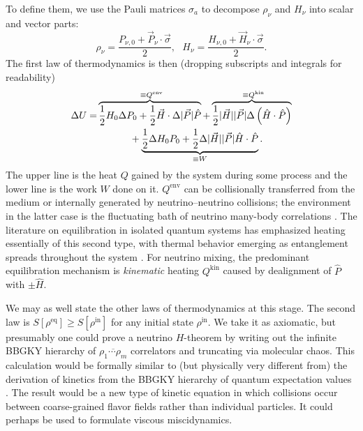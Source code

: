 \documentclass[aps,prd,twocolumn,groupedaddress,preprintnumbers]{revtex4-2}
\begin{document}
To define them, we use the Pauli matrices $\sigma_a$ to decompose $\rho_\nu$ and $H_\nu$ into scalar and vector parts:
\begin{equation}
\rho_\nu = \frac{P_{\nu,0} + \vec{P}_\nu \cdot \vec{\sigma}}{2}, ~~~ H_\nu = \frac{H_{\nu,0} + \vec{H}_\nu \cdot \vec{\sigma}}{2}.
\end{equation}
The first law of thermodynamics is then (dropping subscripts and integrals for readability)
\begin{align}
\Delta U = &\overbrace{\frac{1}{2} H_0 \Delta P_0 + \frac{1}{2} \vec{H} \cdot \Delta| \vec{P}| \hat{P}}^{~ \equiv Q^\textrm{env}} + \overbrace{\frac{1}{2} | \vec{H} | | \vec{P} | \Delta \left( \hat{H} \cdot \hat{P} \right)}^{~ \equiv Q^\textrm{kin}} \notag \\
&~~~~~~~~~~ +\underbrace{\frac{1}{2} \Delta H_0 P_0 + \frac{1}{2} \Delta | \vec{H} | | \vec{P} | \hat{H} \cdot \hat{P}}_{\equiv  W}. \label{eq:firstlaw}
\end{align}
The upper line is the heat $Q$ gained by the system during some process and the lower line is the work $W$ done on it. $Q^\textrm{env}$ can be collisionally transferred from the medium or internally generated by neutrino--neutrino collisions; the environment in the latter case is the fluctuating bath of neutrino many-body correlations \cite{johns2023b, kost2024once}. The literature on equilibration in isolated quantum systems has emphasized heating essentially of this second type, with thermal behavior emerging as entanglement spreads throughout the system \cite{gogolin2016, dalessio2016, ueda2020}. For neutrino mixing, the predominant equilibration mechanism is \textit{kinematic} heating $Q^\textrm{kin}$ caused by dealignment of $\hat{P}$ with $\pm \hat{H}$.

We may as well state the other laws of thermodynamics at this stage. The second law is $S[\rho^\textrm{eq}] \geq S[\rho^\textrm{in}]$ for any initial state $\rho^\textrm{in}$. We take it as axiomatic, but presumably one could prove a neutrino $H$-theorem by writing out the infinite BBGKY hierarchy of $\overline{\rho_1 \dotsb \rho_m}$ correlators and truncating via molecular chaos. This calculation would be formally similar to (but physically very different from) the derivation of kinetics from the BBGKY hierarchy of quantum expectation values \cite{volpe2013, froustey2020}. The result would be a new type of kinetic equation in which collisions occur between coarse-grained flavor fields rather than individual particles. It could perhaps be used to formulate viscous miscidynamics.
\end{document}
